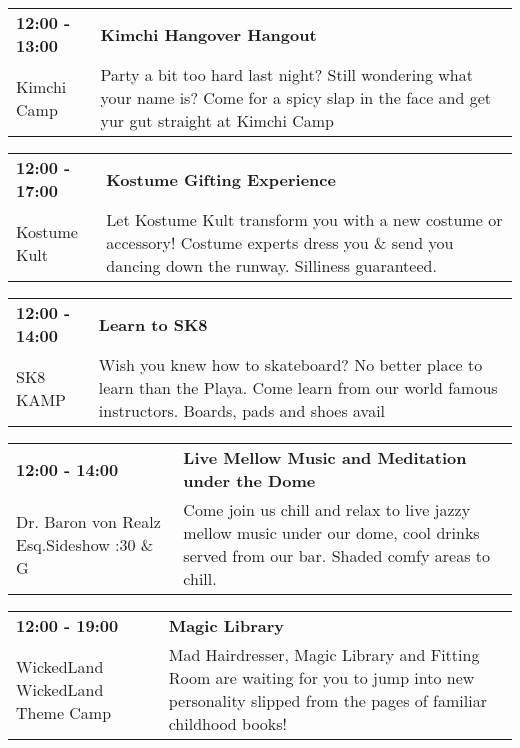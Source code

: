 \begin{tabular}{ p{1in} p{2.2in} }
    \textbf{12:00 - 13:00} & \textbf{Kimchi Hangover Hangout} \\
    Kimchi Camp \newline  & Party a bit too hard last night? Still wondering what your name is? Come for a spicy slap in the face and get yur gut straight at Kimchi Camp \\
    \hline 
\end{tabular}
    
\begin{tabular}{ p{1in} p{2.2in} }
    \textbf{12:00 - 17:00} & \textbf{Kostume Gifting Experience} \\
    Kostume Kult \newline  & Let Kostume Kult transform you with a new costume or accessory! Costume experts dress you \& send you dancing down the runway. Silliness guaranteed. \\
    \hline 
\end{tabular}
    
\begin{tabular}{ p{1in} p{2.2in} }
    \textbf{12:00 - 14:00} & \textbf{Learn to SK8} \\
    SK8 KAMP \newline  & Wish you knew how to skateboard? No better place to learn than the Playa. Come learn from our world famous instructors.  Boards, pads and shoes avail \\
    \hline 
\end{tabular}
    
\begin{tabular}{ p{1in} p{2.2in} }
    \textbf{12:00 - 14:00} & \textbf{Live Mellow Music and Meditation under the Dome} \\
    Dr. Baron von Realz Esq.Sideshow \newline 4:30 \& G & Come join us chill and relax to live jazzy mellow music under our dome, cool drinks served from our bar. Shaded comfy areas to chill. \\
    \hline 
\end{tabular}
    
\begin{tabular}{ p{1in} p{2.2in} }
    \textbf{12:00 - 19:00} & \textbf{Magic Library} \\
    WickedLand \newline WickedLand Theme Camp & Mad Hairdresser, Magic Library and Fitting Room are waiting for you to jump into new personality slipped from the pages of familiar childhood books! \\
    \hline 
\end{tabular}
    
